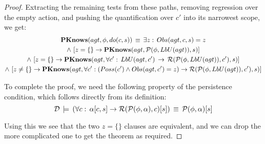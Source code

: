 \begin{proof}
Extracting the remaining tests from these paths, removing regression
over the empty action, and pushing the quantification over $c'$ into
its narrowest scope, we get:\begin{multline*}
\mathbf{PKnows}(agt,\phi,do(c,s))\,\equiv\,\exists z:\, Obs(agt,c,s)=z\\
\wedge\,\left[z=\{\}\rightarrow\mathbf{PKnows}(agt,\mathcal{P}(\phi,LbU(agt)),s)\right]\\
\wedge\,\left[z=\{\}\rightarrow\mathbf{PKnows}(agt,\forall c':\, LbU(agt,c')\,\rightarrow\,\mathcal{R}(\mathcal{P}(\phi,LbU(agt)),c'),s)\right]\\
\wedge\,\left[z\neq\{\}\rightarrow\mathbf{PKnows}(agt,\forall c':\left(Poss(c')\wedge Obs(agt,c')=z\right)\rightarrow\mathcal{R}(\mathcal{P}(\phi,LbU(agt)),c'),s)\right]\end{multline*}


To complete the proof, we need the following property of the persistence
condition, which follows directly from its definition:\[
\mathcal{D}\,\models\,\left(\forall c:\,\alpha[c,s]\rightarrow\mathcal{R}(\mathcal{P}(\phi,\alpha),c)[s]\right)\,\equiv\,\mathcal{P}(\phi,\alpha)[s]\]


Using this we see that the two $z=\{\}$ clauses are equivalent, and
we can drop the more complicated one to get the theorem as required. 
\end{proof}
\medskip{}


